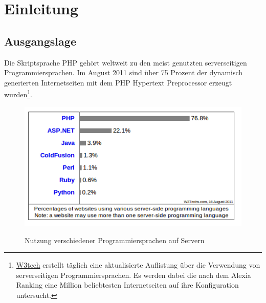 %
%

\chapter{Einleitung}

\section{Ausgangslage}




Die Skriptsprache PHP gehört weltweit zu den meist genutzten serverseitigen Programmiersprachen. Im August 2011 sind über 75 Prozent der dynamisch generierten Internetseiten mit dem PHP Hypertext Preprocessor erzeugt wurden\footnote{\href{http://w3techs.com/}{W3tech} erstellt täglich eine aktualisierte Auflistung über die Verwendung von serverseitigen Programmiersprachen. Es werden dabei die nach dem Alexia Ranking eine Million beliebtesten Internetseiten auf ihre Konfiguration untersucht.}.

\begin{figure}[h]
\begin{center}
\label{fig.programmingusage}
\includegraphics[scale=0.65]{images/Einleitung/serverseitigeScriptsprachen.png}
\caption{Nutzung verschiedener Programmiersprachen auf Servern}
\end{center}
\end{figure}

